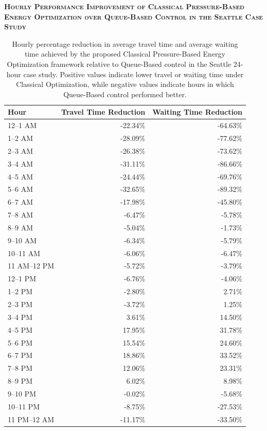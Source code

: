 \documentclass[12pt]{article}
\begin{document}
\begin{table}[H]
\centering
\textbf{\textsc{Hourly Performance Improvement of Classical Pressure-Based Energy Optimization over Queue-Based Control in the Seattle Case Study}}

\vspace{0.3cm}

\begin{tabular}{@{} l r r @{}}
\toprule
\textbf{Hour} & \textbf{Travel Time Reduction} & \textbf{Waiting Time Reduction} \\
\midrule
12--1 AM & -22.34\% & -64.63\% \\
1--2 AM & -28.09\% & -77.62\% \\
2--3 AM & -26.38\% & -73.62\% \\
3--4 AM & -31.11\% & -86.66\% \\
4--5 AM & -24.44\% & -69.76\% \\
5--6 AM & -32.65\% & -89.32\% \\
6--7 AM & -17.98\% & -45.80\% \\
7--8 AM & -6.47\% & -5.78\% \\
8--9 AM & -5.04\% & -1.73\% \\
9--10 AM & -6.34\% & -5.79\% \\
10--11 AM & -6.06\% & -6.47\% \\
11 AM--12 PM & -5.72\% & -3.79\% \\
12--1 PM & -6.76\% & -4.06\% \\
1--2 PM & -2.80\% & 2.71\% \\
2--3 PM & -3.72\% & 1.25\% \\
3--4 PM & 3.61\% & 14.50\% \\
4--5 PM & 17.95\% & 31.78\% \\
5--6 PM & 15.54\% & 24.60\% \\
6--7 PM & 18.86\% & 33.52\% \\
7--8 PM & 12.06\% & 23.31\% \\
8--9 PM & 6.02\% & 8.98\% \\
9--10 PM & -0.02\% & -5.68\% \\
10--11 PM & -8.75\% & -27.53\% \\
11 PM--12 AM & -11.17\% & -33.50\% \\
\bottomrule
\end{tabular}

\caption{Hourly percentage reduction in average travel time and average waiting time achieved by the proposed Classical Pressure-Based Energy Optimization framework relative to Queue-Based control in the Seattle 24-hour case study. Positive values indicate lower travel or waiting time under Classical Optimization, while negative values indicate hours in which Queue-Based control performed better.}
\label{tab:seattle-queue-vs-classical-hourly-percent-table}
\end{table}
\end{document}
